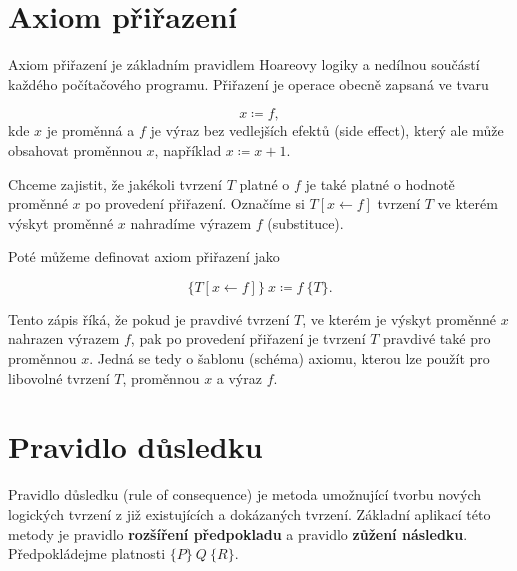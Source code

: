 \section{Axiom přiřazení}
\label{sec:hoare-axiom-prirazeni}

Axiom přiřazení je základním pravidlem Hoareovy logiky a nedílnou součástí každého počítačového programu.
Přiřazení je operace obecně zapsaná ve tvaru

\begin{equation*}
    x \coloneqq f,
\end{equation*}
kde $x$ je proměnná a $f$ je výraz bez vedlejších efektů (side effect),
který ale může obsahovat proměnnou $x$, například $x \coloneqq x + 1$.

Chceme zajistit, že jakékoli tvrzení $T$ platné o $f$
je také platné o hodnotě proměnné $x$ po provedení přiřazení.
Označíme si $T[x \leftarrow f]$ tvrzení $T$ ve kterém výskyt proměnné $x$ nahradíme výrazem $f$ (substituce).

Poté můžeme definovat axiom přiřazení jako

\begin{equation*}
    \{ T[x \leftarrow f] \} \  x \coloneqq f \  \{ T \}.
\end{equation*}

Tento zápis říká, že pokud je pravdivé tvrzení $T$, ve kterém
je výskyt proměnné $x$ nahrazen výrazem $f$, pak po provedení přiřazení
je tvrzení $T$ pravdivé také pro proměnnou $x$.
Jedná se tedy o šablonu (schéma) axiomu,
kterou lze použít pro libovolné tvrzení $T$, proměnnou $x$ a výraz $f$.


\section{Pravidlo důsledku}
\label{sec:hoare-pravidlo-dusledku}

Pravidlo důsledku (rule of consequence) je metoda umožnující
tvorbu nových logických tvrzení z již existujících a dokázaných tvrzení.
Základní aplikací této metody je pravidlo \textbf{rozšíření předpokladu}
a pravidlo \textbf{zůžení následku}.
Předpokládejme platnosti $\{ P \} \  Q \  \{ R \}$.

